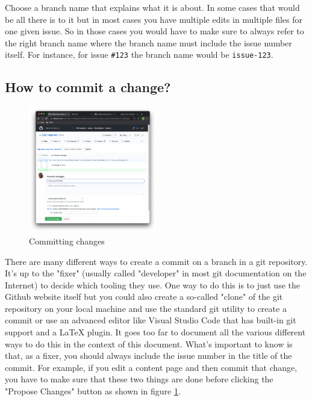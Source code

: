 Choose a branch name that explains what it is about. 
In some cases that would be all there is to it but in most cases you 
have multiple edits in multiple files for one given issue. 
So in those cases you would have to make sure to always refer to 
the right branch name where the branch name must include the 
issue number itself. 
For instance, for issue \texttt{\#123} the branch name would 
be \texttt{issue-123}.

\subsection{How to commit a change?}
\label{subsec:ekg-mm-process-how-to-commit}

%
%
\begin{figure}
    \vspace{-12pt}
    \begin{center}
        \includegraphics[width=0.50\textwidth]{../images/ekgmm-process-commit-changes.png}
    \end{center}
    \caption{Committing changes}
    \label{fig:ekgmm-process-commit-changes}
\end{figure}

There are many different ways to create a commit on a branch in a 
git repository. It’s up to the "fixer" (usually called "developer"
in most git documentation on the Internet) to decide which
tooling they use.
One way to do this is to just use the Github website itself but you
could also create a so-called "clone" of the git repository on your 
local machine and use the standard git utility to create a commit or 
use an advanced editor like Visual Studio Code that has built-in 
git support and a LaTeX plugin. 
It goes too far to document all the various different ways to do this 
in the context of this document.
What’s important to know is that, as a fixer, you should always include
the issue number in the title of the commit. 
For example, if you edit a content page and then commit that change, 
you have to make sure that these two things are done before clicking 
the "Propose Changes" button as shown in figure \ref{fig:ekgmm-process-commit-changes}.

